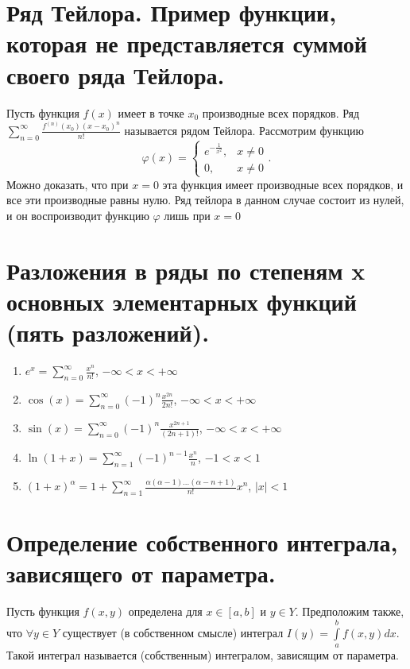 \documentclass[12pt, a4paper]{article}
\begin{document}
\section{Ряд Тейлора. Пример функции, которая не представляется суммой своего ряда Тейлора.}
Пусть функция $f(x)$ имеет в точке  $x_0$ производные всех порядков. 
\newline
Ряд $\sum\limits_{n=0}^{\infty} \frac{f^{(n)}(x_0)(x - x_0)^n}{n!}$ называется рядом Тейлора. 
\newline
Рассмотрим функцию 
\[
	\varphi\left( x \right) =
	\begin{cases}
		e^{-\frac{1}{x^2}}, & x \neq  0 \\
		0, & x \neq  0
	\end{cases}
.\] 
Можно доказать, что при $x = 0$ эта функция имеет производные всех порядков, и все эти производные равны нулю. Ряд тейлора в данном случае состоит из нулей, и он воспроизводит функцию  $\varphi$ лишь при $x = 0$


\section{Разложения в ряды по степеням x основных элементарных функций (пять разложений).}
\begin{enumerate}
	\item $e^x = \sum\limits_{n=0}^{\infty} \frac{x^n}{n!}$, $-\infty < x < +\infty$
	\item $\cos\left( x \right) = \sum\limits_{n=0}^{\infty}(-1)^n \frac{x^{2n}}{2n!} $, $-\infty < x < +\infty$
	\item $\sin(x) = \sum\limits_{n=0}^{\infty} (-1)^n \frac{x^{2n + 1}}{(2n + 1)!}$, $-\infty < x < +\infty$ 
	\item $\ln\left( 1 + x \right)  = \sum\limits_{n=1}^{\infty} (-1)^{n-1} \frac{x^n}{n}$, $-1 < x < 1$ 
	\item  $ (1 + x)^\alpha = 1 + \sum\limits_{n=1}^{\infty} \frac{\alpha(\alpha - 1)\ldots(\alpha - n + 1)}{n!}x^n$, $ |x| < 1 $ 
\end{enumerate}


\section{Определение собственного интеграла, зависящего от параметра.}
Пусть функция $f(x, y)$ определена для  $x \in [a, b]$ и  $y \in Y$. Предположим также, что  $\forall y \in Y$ существует (в собственном смысле) интеграл $I(y) = \int\limits_{a}^{b}f\left(x, y \right)dx$. Такой интеграл называется (собственным) интегралом, зависящим от параметра.
\end{document}

